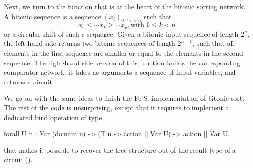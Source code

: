 \documentclass{llncs}
\begin{document}
Next, we turn to the function that is at the heart of the bitonic
sorting network.
%
A bitonic sequence is a sequence $(x_i)_{0 \le i < n}$ such that
$$ x_0 \le \cdots x_k \ge \cdots x_n, \text{with } 0 \le k < n $$
or a circular shift of such a sequence.
%
Given a bitonic input sequence of length $2^n$, the left-hand side
 returns two bitonic sequences of length $2^{n-1}$,
such that all elements in the first sequence are smaller or equal to
the elements in the second sequence. 
%
The right-hand side version of this function builds the corresponding
comparator network: it takes as arguments a sequence of input
variables, and returns a circuit. 

We go on with the same ideas to finish the Fe-Si implementation of
bitonic sort. The rest of the code is unsurprising, except that it
requires to implement a dedicated bind operation of type
\begin{coq}
forall U n : Var (domain n) -> (T n -> action [] Var U) -> action [] Var U. 
\end{coq}
that makes it possible to recover the tree structure out of the
result-type of a circuit ().
\end{document}
